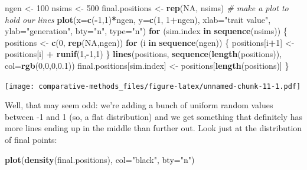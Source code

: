 \documentclass[
]{article}
\newenvironment{Shaded}{\begin{snugshade}}{\end{snugshade}}
\newcommand{\CommentTok}[1]{\textcolor[rgb]{0.56,0.35,0.01}{\textit{#1}}}
\newcommand{\ControlFlowTok}[1]{\textcolor[rgb]{0.13,0.29,0.53}{\textbf{#1}}}
\newcommand{\DataTypeTok}[1]{\textcolor[rgb]{0.13,0.29,0.53}{#1}}
\newcommand{\DecValTok}[1]{\textcolor[rgb]{0.00,0.00,0.81}{#1}}
\newcommand{\FloatTok}[1]{\textcolor[rgb]{0.00,0.00,0.81}{#1}}
\newcommand{\KeywordTok}[1]{\textcolor[rgb]{0.13,0.29,0.53}{\textbf{#1}}}
\newcommand{\NormalTok}[1]{#1}
\newcommand{\OperatorTok}[1]{\textcolor[rgb]{0.81,0.36,0.00}{\textbf{#1}}}
\newcommand{\OtherTok}[1]{\textcolor[rgb]{0.56,0.35,0.01}{#1}}
\newcommand{\StringTok}[1]{\textcolor[rgb]{0.31,0.60,0.02}{#1}}
\begin{document}
\begin{Shaded}
\begin{Highlighting}[]
\NormalTok{ngen <{-}}\StringTok{ }\DecValTok{100}
\NormalTok{nsims <{-}}\StringTok{ }\DecValTok{500}
\NormalTok{final.positions <{-}}\StringTok{ }\KeywordTok{rep}\NormalTok{(}\OtherTok{NA}\NormalTok{, nsims)}
\CommentTok{\# make a plot to hold our lines}
\KeywordTok{plot}\NormalTok{(}\DataTypeTok{x=}\KeywordTok{c}\NormalTok{(}\OperatorTok{{-}}\DecValTok{1}\NormalTok{,}\DecValTok{1}\NormalTok{)}\OperatorTok{*}\NormalTok{ngen, }\DataTypeTok{y=}\KeywordTok{c}\NormalTok{(}\DecValTok{1}\NormalTok{, }\DecValTok{1}\OperatorTok{+}\NormalTok{ngen), }\DataTypeTok{xlab=}\StringTok{"trait value"}\NormalTok{, }\DataTypeTok{ylab=}\StringTok{"generation"}\NormalTok{, }\DataTypeTok{bty=}\StringTok{"n"}\NormalTok{, }\DataTypeTok{type=}\StringTok{"n"}\NormalTok{)}
\ControlFlowTok{for}\NormalTok{ (sim.index }\ControlFlowTok{in} \KeywordTok{sequence}\NormalTok{(nsims)) \{}
\NormalTok{  positions <{-}}\StringTok{ }\KeywordTok{c}\NormalTok{(}\DecValTok{0}\NormalTok{, }\KeywordTok{rep}\NormalTok{(}\OtherTok{NA}\NormalTok{,ngen))}
  \ControlFlowTok{for}\NormalTok{ (i }\ControlFlowTok{in} \KeywordTok{sequence}\NormalTok{(ngen)) \{}
\NormalTok{    positions[i}\OperatorTok{+}\DecValTok{1}\NormalTok{] <{-}}\StringTok{ }\NormalTok{positions[i] }\OperatorTok{+}\StringTok{ }\KeywordTok{runif}\NormalTok{(}\DecValTok{1}\NormalTok{,}\OperatorTok{{-}}\DecValTok{1}\NormalTok{,}\DecValTok{1}\NormalTok{)}
\NormalTok{  \}}
  \KeywordTok{lines}\NormalTok{(positions, }\KeywordTok{sequence}\NormalTok{(}\KeywordTok{length}\NormalTok{(positions)), }\DataTypeTok{col=}\KeywordTok{rgb}\NormalTok{(}\DecValTok{0}\NormalTok{,}\DecValTok{0}\NormalTok{,}\DecValTok{0}\NormalTok{,}\FloatTok{0.1}\NormalTok{))}
\NormalTok{  final.positions[sim.index] <{-}}\StringTok{ }\NormalTok{positions[}\KeywordTok{length}\NormalTok{(positions)]}
\NormalTok{\}}
\end{Highlighting}
\end{Shaded}

\texttt{[image: comparative-methods\_files/figure-latex/unnamed-chunk-11-1.pdf]}

Well, that may seem odd: we're adding a bunch of uniform random values between -1 and 1 (so, a flat distribution) and we get something that definitely has more lines ending up in the middle than further out. Look just at the distribution of final points:

\begin{Shaded}
\begin{Highlighting}[]
\KeywordTok{plot}\NormalTok{(}\KeywordTok{density}\NormalTok{(final.positions), }\DataTypeTok{col=}\StringTok{"black"}\NormalTok{, }\DataTypeTok{bty=}\StringTok{"n"}\NormalTok{)}
\end{Highlighting}
\end{Shaded}
\end{document}

